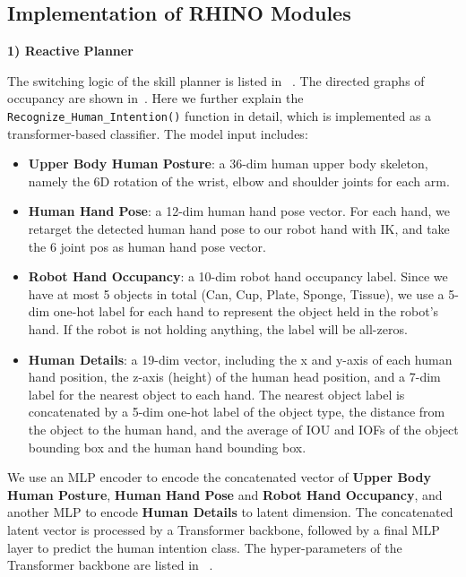 \subsection{Implementation of RHINO Modules}

\label{app:implementation}

\noindent\textbf{1) Reactive Planner}




% 
The switching logic of the skill planner is listed in ~.
The directed graphs of occupancy are shown in~.
Here we further explain the \texttt{Recognize\_Human\_Intention()} function in detail, which is implemented as a transformer-based classifier. The model input includes:
\begin{itemize}[leftmargin=*]
    \item \textbf{Upper Body Human Posture}: a 36-dim human upper body skeleton, namely the 6D rotation of the wrist, elbow and shoulder joints for each arm.
    \item \textbf{Human Hand Pose}: a 12-dim human hand pose vector. For each hand, we retarget the detected human hand pose to our robot hand with IK, and take the 6 joint pos as human hand pose vector.
    \item \textbf{Robot Hand Occupancy}: a 10-dim robot hand occupancy label. Since we have at most 5 objects in total (Can, Cup, Plate, Sponge, Tissue), we use a 5-dim one-hot label for each hand to represent the object held in the robot's hand. If the robot is not holding anything, the label will be all-zeros.
    \item \textbf{Human Details}: a 19-dim vector, including the x and y-axis of each human hand position, the z-axis (height) of the human head position, and a 7-dim label for the nearest object to each hand. The nearest object label is concatenated by a 5-dim one-hot label of the object type, the distance from the object to the human hand, and the average of IOU and IOFs of the object bounding box and the human hand bounding box.
\end{itemize}
We use an MLP encoder to encode the concatenated vector of  \textbf{Upper Body Human Posture}, \textbf{Human Hand Pose} and \textbf{Robot Hand Occupancy}, and another MLP to encode \textbf{Human Details} to latent dimension. The concatenated latent vector is processed by a Transformer backbone, followed by a final MLP layer to predict the human intention class. The 
hyper-parameters of the Transformer backbone are listed in ~.

